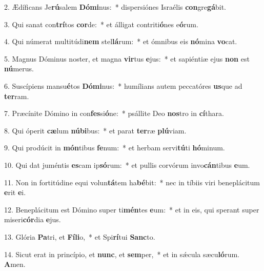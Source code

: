 2. Ædíficans Je\textbf{rú}salem \textbf{Dó}\textbf{mi}nus:~*  dispersiónes Israélis \textbf{con}gre\textbf{gá}bit.\

3. Qui sanat con\textbf{trí}tos \textbf{cor}de:~*  et álligat contriti\textbf{ó}nes e\textbf{ó}rum.\

4. Qui númerat multitúdi\textbf{nem} stel\textbf{lá}rum:~*  et ómnibus eis \textbf{nó}mina \textbf{vo}cat.\

5. Magnus Dóminus noster, et magna \textbf{vir}tus \textbf{e}jus:~*  et sapiéntiæ ejus \textbf{non} est \textbf{nú}merus.\

6. Suscípiens mansu\textbf{é}tos \textbf{Dó}\textbf{mi}nus:~*  humílians autem peccatóres \textbf{us}que ad \textbf{ter}ram.\

7. Præcínite Dómino in con\textbf{fes}si\textbf{ó}ne:~*  psállite Deo \textbf{nos}tro in \textbf{cí}thara.\

8. Qui óperit \textbf{cæ}lum \textbf{nú}\textbf{bi}bus:~*  et parat \textbf{ter}ræ \textbf{plú}viam.\

9. Qui prodúcit in \textbf{món}tibus \textbf{fe}num:~*  et herbam servi\textbf{tú}ti \textbf{hó}minum.\

10. Qui dat juméntis \textbf{es}cam ip\textbf{só}rum:~*  et pullis corvórum invo\textbf{cán}tibus \textbf{e}um.\

11. Non in fortitúdine equi volun\textbf{tá}tem ha\textbf{bé}bit:~*  nec in tíbiis viri beneplácitum \textbf{e}rit \textbf{e}i.\

12. Beneplácitum est Dómino super ti\textbf{mén}tes \textbf{e}um:~*  et in eis, qui sperant super miseri\textbf{cór}dia \textbf{e}jus.\

13. Glória \textbf{Pa}tri, et \textbf{Fí}\textbf{li}o,~*  et Spi\textbf{rí}tui \textbf{Sanc}to.\

14. Sicut erat in princípio, et \textbf{nunc}, et \textbf{sem}per,~*  et in sǽcula sæcu\textbf{ló}rum. \textbf{A}men.\

